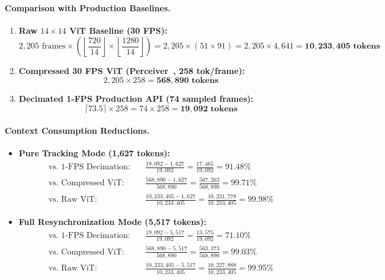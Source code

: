 \documentclass[11pt]{article}
\begin{document}
\paragraph{Comparison with Production Baselines.}
\begin{enumerate}
    \item \textbf{Raw $14\times14$ ViT Baseline (30 FPS):}
    \begin{equation}
    2,205\text{ frames} \times \left( \left\lfloor \frac{720}{14} \right\rfloor \times \left\lfloor \frac{1280}{14} \right\rfloor \right) = 2,205 \times (51 \times 91) = 2,205 \times 4,641 = \mathbf{10,233,405\text{ tokens}}
    \end{equation}
    \item \textbf{Compressed 30 FPS ViT (Perceiver~\citep{jaegle2021perceiver}, 258 tok/frame):}
    \begin{equation}
    2,205 \times 258 = \mathbf{568,890\text{ tokens}}
    \end{equation}
    \item \textbf{Decimated 1-FPS Production API (74 sampled frames):}
    \begin{equation}
    \lceil 73.5 \rceil \times 258 = 74 \times 258 = \mathbf{19,092\text{ tokens}}
    \end{equation}
\end{enumerate}

\paragraph{Context Consumption Reductions.}
\begin{itemize}
    \item \textbf{Pure Tracking Mode (1,627 tokens):}
    \begin{align}
    \text{vs.~1-FPS Decimation:} \quad &\frac{19,092 - 1,627}{19,092} = \frac{17,465}{19,092} = \mathbf{91.48\%} \\
    \text{vs.~Compressed ViT:} \quad &\frac{568,890 - 1,627}{568,890} = \frac{567,263}{568,890} = \mathbf{99.71\%} \\
    \text{vs.~Raw ViT:} \quad &\frac{10,233,405 - 1,627}{10,233,405} = \frac{10,231,778}{10,233,405} = \mathbf{99.98\%}
    \end{align}
    \item \textbf{Full Resynchronization Mode (5,517 tokens):}
    \begin{align}
    \text{vs.~1-FPS Decimation:} \quad &\frac{19,092 - 5,517}{19,092} = \frac{13,575}{19,092} = \mathbf{71.10\%} \\
    \text{vs.~Compressed ViT:} \quad &\frac{568,890 - 5,517}{568,890} = \frac{563,373}{568,890} = \mathbf{99.03\%} \\
    \text{vs.~Raw ViT:} \quad &\frac{10,233,405 - 5,517}{10,233,405} = \frac{10,227,888}{10,233,405} = \mathbf{99.95\%}
    \end{align}
\end{itemize}
\end{document}
